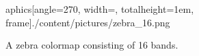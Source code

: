 \begin{description}
\begin{figure}[htb]
aphics[angle=270, width=\linewidth, totalheight=1em, frame]{./content/pictures/zebra_16.png}
				\caption{A zebra colormap consisting of 16 bands. }
			\end{figure}
		\end{description}


